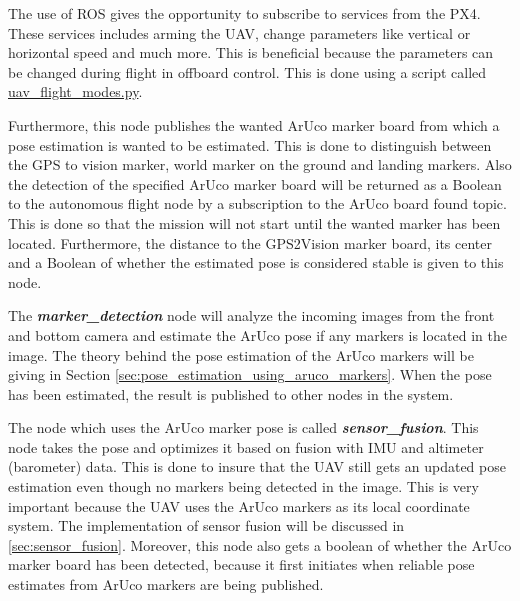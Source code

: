 \documentclass[../Head/report.tex]{subfiles}
\begin{document}
The use of ROS gives the opportunity to subscribe to services from the PX4. These services includes arming the UAV, change parameters like vertical or horizontal speed and much more. This is beneficial because the parameters can be changed during flight in offboard control. This is done using a script called \href{https://github.com/Kenil16/master\_project/blob/master/software/ros\_workspace/src/offboard\_control/uav\_flight\_modes.py}{uav\_flight\_modes.py}. 	

Furthermore, this node publishes the wanted ArUco marker board from which a pose estimation is wanted to be estimated. This is done to distinguish between the GPS to vision marker, world marker on the ground and landing markers. Also the detection of the specified ArUco marker board will be returned as a Boolean to the autonomous flight node by a subscription to the ArUco board found topic. This is done so that the mission will not start until the wanted marker has been located. Furthermore, the distance to the GPS2Vision marker board, its center and a Boolean of whether the estimated pose is considered stable is given to this node.  

The \textit{\textbf{marker\_detection}} node will analyze the incoming images from the front and bottom camera and estimate the ArUco pose if any markers is located in the image. The theory behind the pose estimation of the ArUco markers will be giving in Section \ref{sec:pose_estimation_using_aruco_markers}. When the pose has been estimated, the result is published to other nodes in the system.

The node which uses the ArUco marker pose is called \textit{\textbf{sensor\_fusion}}. This node takes the pose and optimizes it based on fusion with IMU and altimeter (barometer) data. This is done to insure that the UAV still gets an updated pose estimation even though no markers being detected in the image. This is very important because the UAV uses the ArUco markers as its local coordinate system. The implementation of sensor fusion will be discussed in \ref{sec:sensor_fusion}. Moreover, this node also gets a boolean of whether the ArUco marker board has been detected, because it first initiates when reliable pose estimates from ArUco markers are being published. 
\end{document}
